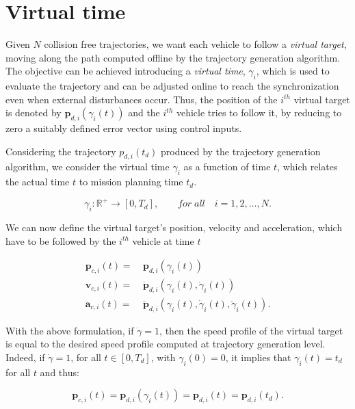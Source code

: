 \section{Virtual time\label{sec:virtual_time}}

Given $ N $ collision free trajectories, we want each vehicle to follow a \textit{virtual target},
moving along the path computed offline by the trajectory generation algorithm.
The objective can be achieved introducing a \textit{virtual time}, $ \gamma_i $,
which is used to evaluate the trajectory and can be adjusted online to reach
the synchronization even when external disturbances occur.
Thus, the position of the $ i^{th} $ virtual target is denoted by $ \bm{p}_{d,i} ( \gamma_i (t))$
and the $ i^{th} $ vehicle tries to follow it, by reducing to zero a suitably defined
error vector using control inputs.

Considering the trajectory $ p_{d,i} (t_d) $ produced by the trajectory generation
algorithm, we consider the virtual time $ \gamma_i $ as a function of time $ t $,
which relates the actual time $t$ to mission planning time $t_d$.

\begin{equation}  \label{eq:virt_time_func}
  \gamma_i : \mathbb{R}^+ \rightarrow [0, T_d], \qquad for \; all \quad i = 1,2,\dots,N.
\end{equation}

We can now define the virtual target's position, velocity and acceleration, which
have to be followed by the $ i^{th}$ vehicle at time $t$

\begin{equation}  \label{eq:pos_vel_acc_def}
  \begin{aligned}
  \bm{p}_{c,i}(t) = \ & \bm{p}_{d,i}(\gamma_i(t)) \\
  \bm{v}_{c,i}(t) = \ & \dot{\bm{p}}_{d,i} (\gamma_i(t), \dot{\gamma}_i (t)) \\
  \bm{a}_{c,i}(t) = \ & \ddot{\bm{p}}_{d,i} (\gamma_i(t), \dot{\gamma}_i(t), \ddot{\gamma}_i(t)).
  \end{aligned}
\end{equation}

With the above formulation, if $ \dot{\gamma} = 1$, then the speed profile of
the virtual target is equal to the desired speed profile computed at trajectory
generation level.
Indeed, if $ \dot{\gamma} = 1$, for all $t \in [0, T_d]$, with $\gamma_i(0) = 0$,
it implies that $\gamma_i(t) = t_d$ for all $t$ and thus:

\begin{equation*}
  \bm{p}_{c,i}(t) = \bm{p}_{d,i}(\gamma_i(t)) = \bm{p}_{d,i}(t) = \bm{p}_{d,i} (t_d).
\end{equation*}

